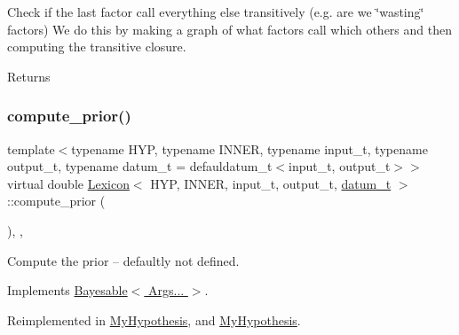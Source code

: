 Check if the last factor call everything else transitively (e.\+g. are we \char`\"{}wasting\char`\"{} factors) We do this by making a graph of what factors call which others and then computing the transitive closure. \begin{DoxyReturn}{Returns}

\end{DoxyReturn}
\mbox{\label{class_lexicon_a2e099a68dd08d62897b40647f92eba1c}} 
\subsubsection{\texorpdfstring{compute\+\_\+prior()}{compute\_prior()}}
{\footnotesize\ttfamily template$<$typename H\+YP, typename I\+N\+N\+ER, typename input\+\_\+t, typename output\+\_\+t, typename datum\+\_\+t = defauldatum\+\_\+t$<$input\+\_\+t, output\+\_\+t$>$$>$ \\
virtual double \hyperlink{class_lexicon}{Lexicon}$<$ H\+YP, I\+N\+N\+ER, input\+\_\+t, output\+\_\+t, \hyperlink{class_bayesable_a9f1a6c0cd7855550fa10b1a8f13a5867}{datum\+\_\+t} $>$\+::compute\+\_\+prior (\begin{DoxyParamCaption}{ }\end{DoxyParamCaption})\hspace{0.3cm}{\ttfamily [inline]}, {\ttfamily [override]}, {\ttfamily [virtual]}}



Compute the prior -- defaultly not defined. 



Implements \hyperlink{class_bayesable_a1b057a17212ced123545133e2297c01b}{Bayesable$<$ Args... $>$}.



Reimplemented in \hyperlink{class_my_hypothesis_ab092094c5fc31730de4f40609220bb18}{My\+Hypothesis}, and \hyperlink{class_my_hypothesis_a67477313b60b21158bbfaad35dc5d275}{My\+Hypothesis}.

\mbox{\label{class_lexicon_a9c1bf25acf10591531c3a9f49f2cfd57}} 

